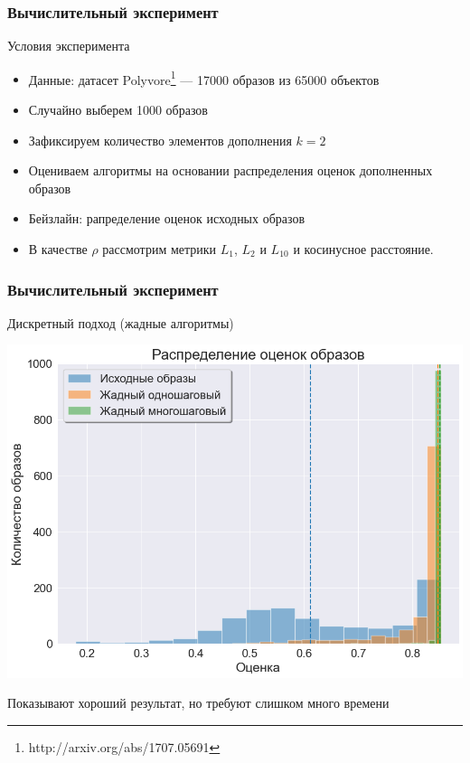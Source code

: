 \documentclass[10pt]{beamer}
\begin{document}
\begin{frame}
	\frametitle{Вычислительный эксперимент}
	\begin{block}{Условия эксперимента}
		\begin{itemize}
			\item Данные: датасет Polyvore\footnote{http://arxiv.org/abs/1707.05691} --- 17000 образов из 65000 объектов
			\item Случайно выберем 1000 образов 
			\item Зафиксируем количество элементов дополнения $k=2$
			\item Оцениваем алгоритмы на основании распределения оценок дополненных образов
			\item Бейзлайн: рапределение оценок исходных образов
			\item В качестве $\rho$ рассмотрим метрики $L_1$, $L_2$ и $L_{10}$ и косинусное расстояние.
		\end{itemize}
	\end{block}
\end{frame}


\begin{frame}
	\frametitle{Вычислительный эксперимент}
	\begin{block}{Дискретный подход (жадные алгоритмы)}
		\vspace{-0.3cm}
		\begin{center}
		\includegraphics[scale = 0.47]{../figures/greedy_at_least_5_subset1000.png}
		\end{center}
		
		Показывают хороший результат, но требуют слишком много времени
	\end{block}
\end{frame}
\end{document}
